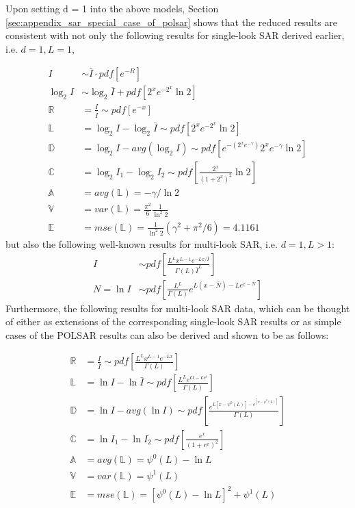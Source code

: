 Upon setting d = 1 into the above models,
  Section \ref{sec:appendix_sar_special_case_of_polsar} shows that the reduced results
are consistent with not only the following results for single-look SAR derived earlier, i.e. $d =1,  L = 1$,

{\footnotesize
\begin{align*}  
  I &\sim \bar{I} \cdot pdf \left[ e^{-R} \right] \\
  \log_2{I} &\sim \log_2{\bar{I}} + pdf \left[ 2^xe^{-2^x}\ln2 \right] \\
  \mathbb{R} &= \frac{I}{\bar{I}} \sim pdf \left[ e^{-x} \right]  \\
  \mathbb{L} &= \log_2{I} - \log_2{\bar{I}} \sim pdf \left[ 2^xe^{-2^x}\ln2 \right]\\
  \mathbb{D} &= \log_2{I} - avg(\log_2{I}) \sim pdf \left[ e^{-(2^xe^{-\gamma})} 2^xe^{-\gamma} \ln2 \right] \\
  \mathbb{C} &= \log_2{I_1} - \log_2{I_2} \sim pdf \left[ \frac{2^x}{(1+2^x)^2} \ln2 \right] \\
  \mathbb{A} &= avg(\mathbb{L}) = -\gamma / \ln{2} \\
  \mathbb{V} &= var(\mathbb{L}) = \frac{\pi^2}{6} \frac{1}{ \ln^2{2}} \\
  \mathbb{E} &= mse(\mathbb{L}) = \frac{1}{\ln^2{2}}( \gamma^2 + \pi^2/6 ) = 4.1161 
\end{align*}
}%
but also the following well-known results for multi-look SAR, i.e. $d=1,L>1$:
  \begin{align*}
I &\sim pdf \left[ \frac{L^L x^{L-1} e^{-Lx/\bar{I}}}{\Gamma(L) \bar{I}^L} \right] \\
N = \ln{I} &\sim pdf \left[ \frac{L^L}{\Gamma(L)} e^{L(x-\bar{N})-Le^{x-\bar{N}}} \right]
  \end{align*}
Furthermore, the following results for multi-look SAR data, which can be thought of
either as extensions of the corresponding single-look SAR results or as simple cases of
the POLSAR results can also be derived and shown to be as follows:

  \begin{align*}
    \mathbb{R} &= \frac{I}{\bar{I}} \sim pdf \left[ \frac{ L^{L} x^{L-1} e^{-Lx}}{ \Gamma(L)} \label{eqn:multi_look_SAR_ratio_dist} \right]\\
    \mathbb{L} &= \ln{I} - \ln{\bar{I}} \sim pdf \left[ \frac{L^Le^{Lt-Le^t}}{ \Gamma(L)}  \right] \\
    \mathbb{D} &= \ln{I} - avg(\ln{I}) \sim pdf \left[ \frac{e^{L[x-\psi^0(L)]-e^{[x-\psi^0(L)]}}}{\Gamma(L)} \right] \\
    \mathbb{C} &= \ln{I_1} - \ln{I_2} \sim pdf \left[ \frac{e^{x}}{(1+e^x)^{2}} \right] \\
    \mathbb{A} &= avg(\mathbb{L}) = \psi^0(L) - \ln{L} \\
    \mathbb{V} &= var(\mathbb{L}) = \psi^1(L) \\
    \mathbb{E} &= mse(\mathbb{L}) = \left[ \psi^0(L) - \ln{L} \right]^2 + \psi^1(L)
  \end{align*}


